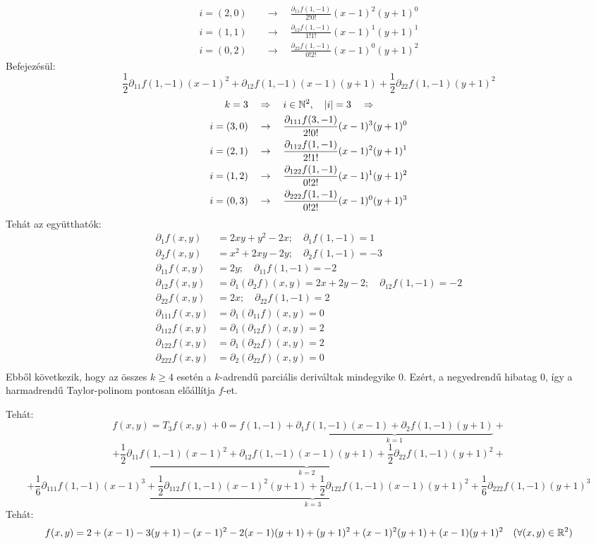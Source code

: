 \documentclass[a4paper,11.5pt]{article}
\begin{document}
\begin{example}
\begin{align*}
			i=(2,0)&\quad \to\quad \frac{\partial_{11}f(1,-1)}{2!0!}(x-1)^2(y+1)^0\\
			i=(1,1)&\quad \to\quad \frac{\partial_{12}f(1,-1)}{1!1!}(x-1)^1(y+1)^1\\
			i=(0,2)&\quad \to\quad \frac{\partial_{22}f(1,-1)}{0!2!}(x-1)^0(y+1)^2
		\end{align*}
		Befejezésül:
		\[ \frac{1}{2}\partial_{11}f(1,-1)(x-1)^2+\partial_{12}f(1,-1)(x-1)(y+1)+\frac{1}{2}\partial_{22}f(1,-1)(y+1)^2 \]
		\begin{align*}
			k=3&\quad \Rightarrow\quad i\in\mathbb{N}^2,\quad |i|=3\quad \Rightarrow\quad\\
			i=(3,0)&\quad \to\quad \frac{\partial_{111}f(3,-1)}{2!0!}(x-1)^3(y+1)^0\\
			i=(2,1)&\quad \to\quad \frac{\partial_{112}f(1,-1)}{2!1!}(x-1)^2(y+1)^1\\
			i=(1,2)&\quad \to\quad \frac{\partial_{122}f(1,-1)}{0!2!}(x-1)^1(y+1)^2\\
			i=(0,3)&\quad \to\quad \frac{\partial_{222}f(1,-1)}{0!2!}(x-1)^0(y+1)^3
		\end{align*}
		Tehát az együtthatók:
		\begin{align*}
			\partial_1f(x,y)&=2xy+y^2-2x;\quad \partial_1f(1,-1)=1\\
			\partial_2f(x,y)&=x^2+2xy-2y;\quad \partial_2f(1,-1)=-3\\
			\partial_{11}f(x,y)&=2y;\quad \partial_{11}f(1,-1)=-2\\
			\partial_{12}f(x,y)&=\partial_1(\partial_2f)(x,y)=2x+2y-2;\quad \partial_{12}f(1,-1)=-2\\
			\partial_{22}f(x,y)&=2x;\quad \partial_{22}f(1,-1)=2\\
			\partial_{111}f(x,y)&=\partial_1(\partial_{11}f)(x,y)=0\\
			\partial_{112}f(x,y)&=\partial_1(\partial_{12}f)(x,y)=2\\
			\partial_{122}f(x,y)&=\partial_1(\partial_{22}f)(x,y)=2\\
			\partial_{222}f(x,y)&=\partial_2(\partial_{22}f)(x,y)=0\\
		\end{align*}
		Ebből következik, hogy az összes $k\geq4$ esetén a $k$-adrendű parciális deriváltak mindegyike 0. Ezért, a negyedrendű hibatag 0, így a harmadrendű Taylor-polinom pontosan előállítja $f$-et.
		
		Tehát:
		\[ f(x,y)=T_3f(x,y)+0=f(1,-1)+\underbrace{\partial_1f(1,-1)(x-1)+\partial_2f(1,-1)(y+1)}_{k=1}+\]
		\[+\underbrace{\frac{1}{2}\partial_{11}f(1,-1)(x-1)^2+\partial_{12}f(1,-1)(x-1)(y+1)+\frac{1}{2}\partial_{22}f(1,-1)(y+1)^2}_{k=2}+\]
		\[+\underbrace{\frac{1}{6}\partial_{111}f(1,-1)(x-1)^3+\frac{1}{2}\partial_{112}f(1,-1)(x-1)^2(y+1)+\frac{1}{2}\partial_{122}f(1,-1)(x-1)(y+1)^2+\frac{1}{6}\partial_{222}f(1,-1)(y+1)^3}_{k=3} \]
		Tehát:
		\[ f(x,y)=2+(x-1)-3(y+1)-(x-1)^2-2(x-1)(y+1)+(y+1)^2+(x-1)^2(y+1)+(x-1)(y+1)^2 \quad (\forall(x,y)\in\mathbb{R}^2)\]
	\end{example}
\end{document}
